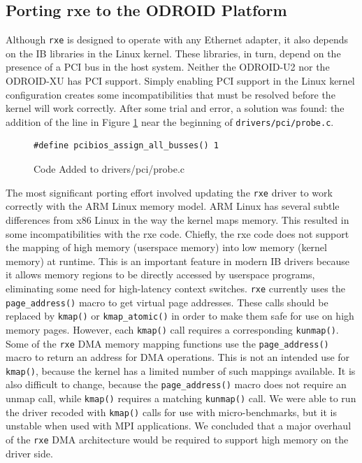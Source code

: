 \documentclass[11pt]{book}
\begin{document}
\subsection{Porting rxe to the ODROID Platform}

Although \verb;rxe; is designed to operate with any Ethernet adapter, it also depends on
the IB libraries in the Linux kernel.  These libraries, in turn, depend on the presence of
a PCI bus in the host system.  Neither the ODROID-U2 nor the ODROID-XU has PCI support.
Simply enabling PCI support in the Linux kernel configuration creates some
incompatibilities that must be resolved before the kernel will work correctly.  After some
trial and error, a solution was found: the addition of the line in Figure \ref{pci_code}
near the beginning of \verb;drivers/pci/probe.c;.

\begin{figure}
\centering
\begin{verbatim}
#define pcibios_assign_all_busses() 1
\end{verbatim}
\caption{Code Added to drivers/pci/probe.c}\label{pci_code}
\end{figure}

The most significant porting effort involved updating the \verb;rxe; driver to work
correctly with the ARM Linux memory model.  ARM Linux has several subtle differences from
x86 Linux in the way the kernel maps memory.  This resulted in some incompatibilities with
the rxe code.  Chiefly, the rxe code does not support the mapping of high memory
(userspace memory) into low memory (kernel memory) at runtime.  This is an important
feature in modern IB drivers because it allows memory regions to be directly accessed by
userspace programs, eliminating some need for high-latency context switches.  \verb;rxe;
currently uses the \verb;page_address(); macro to get virtual page addresses.  These calls
should be replaced by \verb;kmap(); or \verb;kmap_atomic(); in order to make them safe for
use on high memory pages.  However, each \verb;kmap(); call requires a corresponding
\verb;kunmap();.  Some of the \verb;rxe; DMA memory mapping functions use the
\verb;page_address(); macro to return an address for DMA operations.  This is not an
intended use for \verb;kmap();, because the kernel has a limited number of such mappings
available.  It is also difficult to change, because the \verb;page_address(); macro does
not require an unmap call, while \verb;kmap(); requires a matching \verb;kunmap(); call.
We were able to run the driver recoded with \verb;kmap(); calls for use with
micro-benchmarks, but it is unstable when used with MPI applications.  We concluded that a
major overhaul of the \verb;rxe; DMA architecture would be required to support high memory
on the driver side.
\end{document}
